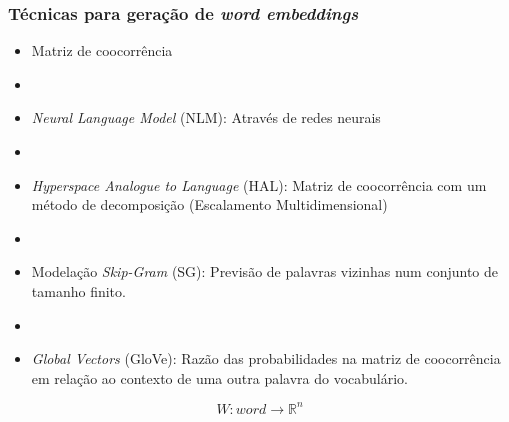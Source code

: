\documentclass[10pt]{beamer}
\begin{document}
\begin{frame}[fragile]
  \frametitle{Técnicas para geração de \textit{word embeddings}}
  
   \begin{itemize}
    \item[-] Matriz de coocorrência

    \item[\ ] \ 

    \item[-] \textit{Neural Language Model} (NLM): Através de redes neurais

    \item[\ ] \ 

    \item[-] \textit{Hyperspace Analogue to Language} (HAL): Matriz de coocorrência com um método de decomposição (Escalamento Multidimensional)

    \item[\ ] \ 

    \item[-] Modelação \textit{Skip-Gram} (SG): Previsão de palavras vizinhas num conjunto de tamanho finito.

    \item[\ ] \ 

    \item[-] \textit{Global Vectors} (GloVe): Razão das probabilidades na matriz de coocorrência em relação ao contexto de uma outra palavra do vocabulário.

  \end{itemize}

  \begin{equation}
  W:word \to \mathbb{R}^n \nonumber
  \end{equation}

\end{frame}
\end{document}
